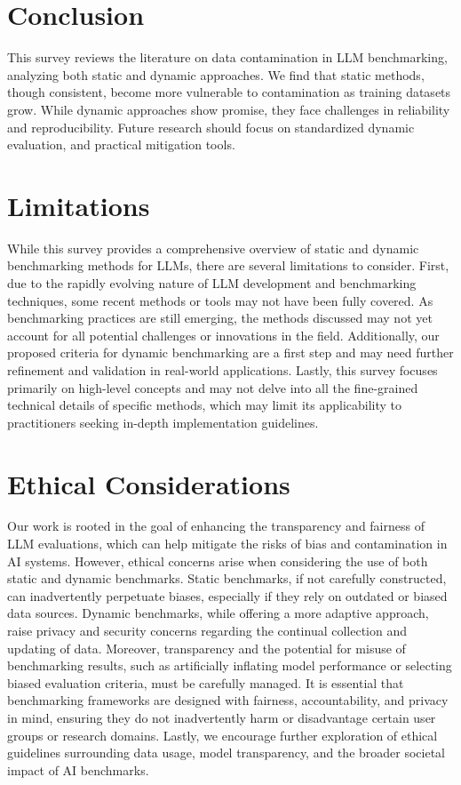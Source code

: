 \vspace{-2mm}
\section{Conclusion}
\vspace{-2mm}
This survey reviews the literature on data contamination in LLM benchmarking, analyzing both static and dynamic approaches. We find that static methods, though consistent, become more vulnerable to contamination as training datasets grow. While dynamic approaches show promise, they face challenges in reliability and reproducibility. Future research should focus on standardized dynamic evaluation, and practical mitigation tools.


\section* {Limitations}

While this survey provides a comprehensive overview of static and dynamic benchmarking methods for LLMs, there are several limitations to consider. First, due to the rapidly evolving nature of LLM development and benchmarking techniques, some recent methods or tools may not have been fully covered. As benchmarking practices are still emerging, the methods discussed may not yet account for all potential challenges or innovations in the field. Additionally, our proposed criteria for dynamic benchmarking are a first step and may need further refinement and validation in real-world applications. Lastly, this survey focuses primarily on high-level concepts and may not delve into all the fine-grained technical details of specific methods, which may limit its applicability to practitioners seeking in-depth implementation guidelines.


\section* {Ethical Considerations}

Our work is rooted in the goal of enhancing the transparency and fairness of LLM evaluations, which can help mitigate the risks of bias and contamination in AI systems. However, ethical concerns arise when considering the use of both static and dynamic benchmarks. Static benchmarks, if not carefully constructed, can inadvertently perpetuate biases, especially if they rely on outdated or biased data sources. Dynamic benchmarks, while offering a more adaptive approach, raise privacy and security concerns regarding the continual collection and updating of data. Moreover, transparency and the potential for misuse of benchmarking results, such as artificially inflating model performance or selecting biased evaluation criteria, must be carefully managed. It is essential that benchmarking frameworks are designed with fairness, accountability, and privacy in mind, ensuring they do not inadvertently harm or disadvantage certain user groups or research domains. Lastly, we encourage further exploration of ethical guidelines surrounding data usage, model transparency, and the broader societal impact of AI benchmarks.